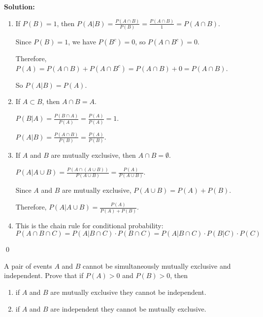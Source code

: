 \noindent\textbf{Solution:}
\begin{enumerate}[label=(\alph*)]
    \item If $P(B) = 1$, then $P(A|B) = \frac{P(A \cap B)}{P(B)} = \frac{P(A \cap B)}{1} = P(A \cap B)$.
    
    Since $P(B) = 1$, we have $P(B^c) = 0$, so $P(A \cap B^c) = 0$.
    
    Therefore, $P(A) = P(A \cap B) + P(A \cap B^c) = P(A \cap B) + 0 = P(A \cap B)$.
    
    So $P(A|B) = P(A)$.
    
    \item If $A \subset B$, then $A \cap B = A$.
    
    $P(B|A) = \frac{P(B \cap A)}{P(A)} = \frac{P(A)}{P(A)} = 1$.
    
    $P(A|B) = \frac{P(A \cap B)}{P(B)} = \frac{P(A)}{P(B)}$.
    
    \item If $A$ and $B$ are mutually exclusive, then $A \cap B = \emptyset$.
    
    $P(A|A \cup B) = \frac{P(A \cap (A \cup B))}{P(A \cup B)} = \frac{P(A)}{P(A \cup B)}$.
    
    Since $A$ and $B$ are mutually exclusive, $P(A \cup B) = P(A) + P(B)$.
    
    Therefore, $P(A|A \cup B) = \frac{P(A)}{P(A) + P(B)}$.
    
    \item This is the chain rule for conditional probability:
    \[ P(A \cap B \cap C) = P(A|B \cap C) \cdot P(B \cap C) = P(A|B \cap C) \cdot P(B|C) \cdot P(C) \]
\end{enumerate}



\qed
\begin{problembox}
A pair of events $A$ and $B$ cannot be simultaneously mutually exclusive and independent. Prove that if $P(A)>0$ and $P(B)>0$, then
\begin{enumerate}[label=(\alph*)]
    \item if $A$ and $B$ are mutually exclusive they cannot be independent.
    \item if $A$ and $B$ are independent they cannot be mutually exclusive.
\end{enumerate}
\end{problembox}

